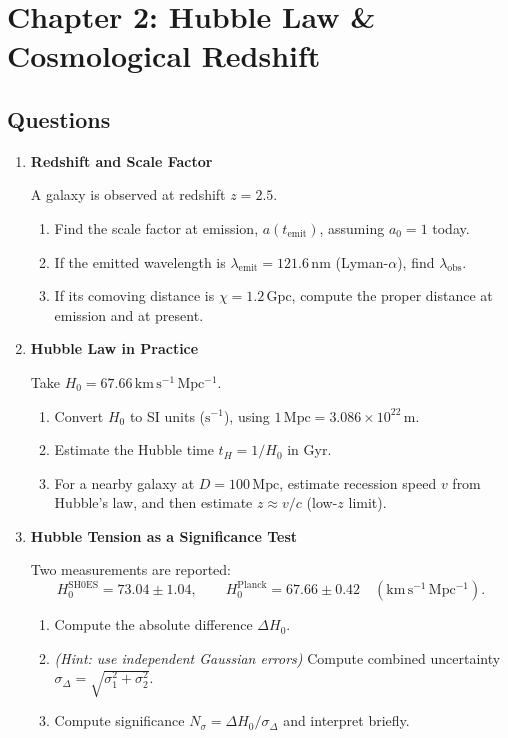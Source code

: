 \clearpage
\section{Chapter 2: Hubble Law \& Cosmological Redshift}

\subsection{Questions}

\begin{enumerate}[label=2.\arabic*]
  \item \label{q:2.1} \textbf{Redshift and Scale Factor}

  A galaxy is observed at redshift $z=2.5$.
  \begin{enumerate}[label=(\alph*)]
    \item Find the scale factor at emission, $a(t_{\mathrm{emit}})$, assuming $a_0=1$ today.
    \item If the emitted wavelength is $\lambda_{\mathrm{emit}}=121.6\,\mathrm{nm}$ (Lyman-$\alpha$), find $\lambda_{\mathrm{obs}}$.
    \item If its comoving distance is $\chi=1.2\,\mathrm{Gpc}$, compute the proper distance at emission and at present.
  \end{enumerate}

  \item \label{q:2.2} \textbf{Hubble Law in Practice}

  Take $H_0 = 67.66\,\mathrm{km\,s^{-1}\,Mpc^{-1}}$.
  \begin{enumerate}[label=(\alph*)]
    \item Convert $H_0$ to SI units ($\mathrm{s^{-1}}$), using $1\,\mathrm{Mpc}=3.086\times 10^{22}\,\mathrm{m}$.
    \item Estimate the Hubble time $t_H = 1/H_0$ in Gyr.
    \item For a nearby galaxy at $D=100\,\mathrm{Mpc}$, estimate recession speed $v$ from Hubble's law, and then estimate $z\approx v/c$ (low-$z$ limit).
  \end{enumerate}

  \item \label{q:2.3} \textbf{Hubble Tension as a Significance Test}

  Two measurements are reported:
  \[
    H_0^{\mathrm{SH0ES}} = 73.04 \pm 1.04,\qquad
    H_0^{\mathrm{Planck}} = 67.66 \pm 0.42
    \quad (\mathrm{km\,s^{-1}\,Mpc^{-1}}).
  \]
  \begin{enumerate}[label=(\alph*)]
    \item Compute the absolute difference $\Delta H_0$.
    \item \textit{(Hint: use independent Gaussian errors)} Compute combined uncertainty
    $\sigma_{\Delta} = \sqrt{\sigma_1^2+\sigma_2^2}$.
    \item Compute significance $N_\sigma = \Delta H_0/\sigma_\Delta$ and interpret briefly.
  \end{enumerate}


\end{enumerate}
